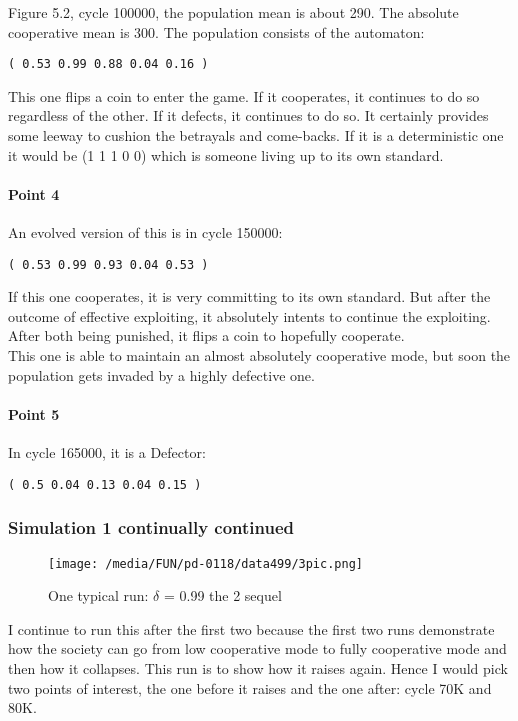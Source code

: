 \documentclass[12.5pt]{report}
\begin{document}
Figure 5.2, cycle 100000, the population mean is about 290. The absolute cooperative mean is 300. The population consists of the automaton:

\begin{verbatim}
( 0.53 0.99 0.88 0.04 0.16 )
\end{verbatim}

This one flips a coin to enter the game. If it cooperates, it continues to do so regardless of the other. If it defects, it continues to do so. It certainly provides some leeway to cushion the betrayals and come-backs. If it is a deterministic one it would be (1 1 1 0 0) which is someone living up to its own standard.

\paragraph{Point 4}

An evolved version of this is in cycle 150000:
\begin{verbatim}
( 0.53 0.99 0.93 0.04 0.53 )
\end{verbatim}

If this one cooperates, it is very committing to its own standard. But after the outcome of effective exploiting, it absolutely intents to continue the exploiting. After both being punished, it flips a coin to hopefully cooperate.\\

This one is able to maintain an almost absolutely cooperative mode, but soon the population gets invaded by a highly defective one. 

\paragraph{Point 5}
In cycle 165000, it is a Defector:

\begin{verbatim}
( 0.5 0.04 0.13 0.04 0.15 )
\end{verbatim}

\subsubsection{Simulation 1 continually continued}

\begin{figure}[h!]
\center
\texttt{[image: /media/FUN/pd-0118/data499/3pic.png]}
\caption{One typical run: $\delta$ = 0.99 the 2 sequel}
\end{figure}
I continue to run this after the first two because the first two runs demonstrate how the society can go from low cooperative mode to fully cooperative mode and then how it collapses. This run is to show how it raises again. Hence I would pick two points of interest, the one before it raises and the one after: cycle 70K and 80K.
\end{document}
